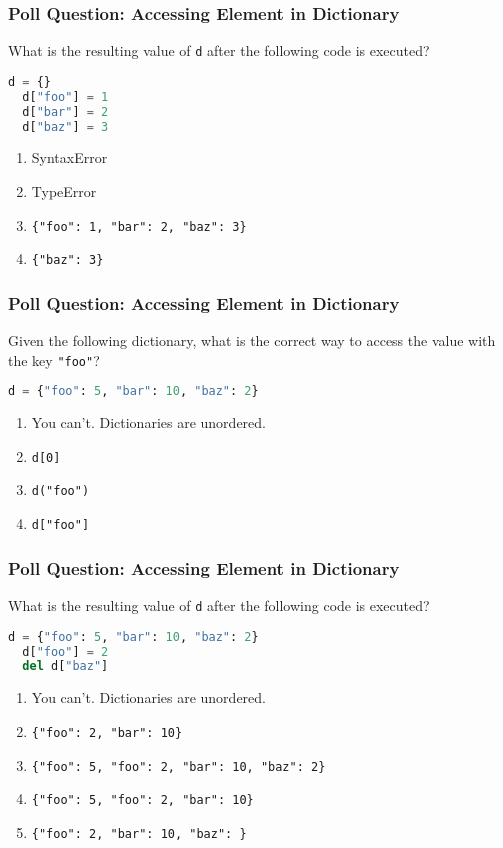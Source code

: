 \documentclass[xcolor=table]{beamer}
\begin{document}
%
%
\begin{frame}[fragile]
  \frametitle{Poll Question: Accessing Element in Dictionary}
  What is the resulting value of \lstinline|d| after the following code is executed?
  \begin{lstlisting}[language=Python, autogobble]
  d = {}
  d["foo"] = 1
  d["bar"] = 2
  d["baz"] = 3
  \end{lstlisting}
  \vfill
  \begin{enumerate}[A] 
    \item SyntaxError
    \item TypeError
    \item \lstinline|{"foo": 1, "bar": 2, "baz": 3}|
    \item \lstinline|{"baz": 3}|
  \end{enumerate}
\end{frame}


%
%
%
\begin{frame}[fragile]
  \frametitle{Poll Question: Accessing Element in Dictionary}
  Given the following dictionary, what is the correct way to access the value with the key \lstinline|"foo"|?
  \begin{lstlisting}[language=Python, autogobble]
  d = {"foo": 5, "bar": 10, "baz": 2}
  \end{lstlisting}
  \vfill
  \begin{enumerate}[A] 
    \item You can't. Dictionaries are unordered.
    \item \lstinline|d[0]|
    \item \lstinline|d("foo")|
    \item \lstinline|d["foo"]| %
  \end{enumerate}
\end{frame}


%
%
\begin{frame}[fragile]
  \frametitle{Poll Question: Accessing Element in Dictionary}
  What is the resulting value of \lstinline|d| after the following code is executed?
  \begin{lstlisting}[language=Python, autogobble]
  d = {"foo": 5, "bar": 10, "baz": 2}
  d["foo"] = 2
  del d["baz"] 
  \end{lstlisting}
  \vfill
  \begin{enumerate}[A] 
    \item You can't. Dictionaries are unordered.
    \item \lstinline|{"foo": 2, "bar": 10}|
    \item \lstinline|{"foo": 5, "foo": 2, "bar": 10, "baz": 2}|
    \item \lstinline|{"foo": 5, "foo": 2, "bar": 10}|
    \item \lstinline|{"foo": 2, "bar": 10, "baz": }|
  \end{enumerate}
\end{frame}
\end{document}
